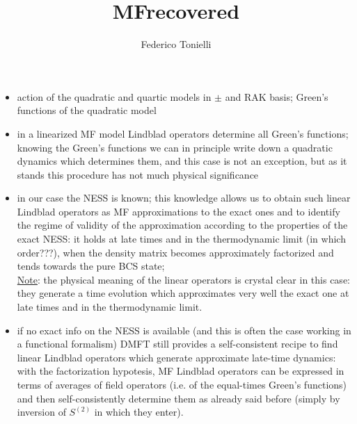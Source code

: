 \documentclass[a4paper,10pt]{article}
\title{MFrecovered}
\author{Federico Tonielli}
\theoremstyle{remark}
\begin{document}
 
 
\begin{itemize}
 \item action of the quadratic and quartic models in $\pm$ and RAK basis; Green's functions of the quadratic model
 
 \item in a linearized MF model Lindblad operators determine all Green's functions; knowing the Green's functions we can in principle write down a quadratic dynamics which determines them, and this case is not an exception, but as it stands this procedure has not much physical significance
 
 \item in our case the NESS is known; this knowledge allows us to obtain such linear Lindblad operators as MF approximations to the exact ones and to identify the regime of validity of the approximation according to the properties of the exact NESS: it holds at late times and in the thermodynamic limit (in which order???), when the density matrix becomes approximately factorized and tends towards the pure BCS state; \\ \underline{Note}: the physical meaning of the linear operators is crystal clear in this case: they generate a time evolution which approximates very well the exact one at late times and in the thermodynamic limit.
 
 \item if no exact info on the NESS is available (and this is often the case working in a functional formalism) DMFT still provides a self-consistent recipe to find linear Lindblad operators which generate approximate late-time dynamics: with the factorization hypotesis, MF Lindblad operators can be expressed in terms of averages of field operators (i.e. of the equal-times Green's functions) and then self-consistently determine them as already said before (simply by inversion of $S^{(2)}$ in which they enter).
 

\end{itemize}
\end{document}
